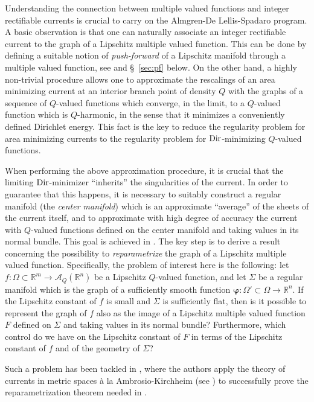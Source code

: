 \documentclass[a4paper,11pt,reqno]{amsart}
\theoremstyle{definition}
\numberwithin{equation}{section}
\numberwithin{subsection}{section}
\newcommand{\R}{\mathbb{R}}
\newcommand{\A}{\mathcal{A}}
\newcommand{\bphi}{\boldsymbol{\varphi}}
\begin{document}
Understanding the connection between multiple valued functions and integer rectifiable currents is crucial to carry on the Almgren-De Lellis-Spadaro program. A basic observation is that one can naturally associate an integer rectifiable current to the graph of a Lipschitz multiple valued function. This can be done by defining a suitable notion of \emph{push-forward} of a Lipschitz manifold through a multiple valued function, see \cite{DLS13a} and \S\, \ref{sec:pf} below. On the other hand, a highly non-trivial procedure allows one to approximate the rescalings of an area minimizing current at an interior branch point of density $Q$ with the graphs of a sequence of $Q$-valued functions which converge, in the limit, to a $Q$-valued function which is $Q$-harmonic, in the sense that it minimizes a conveniently defined Dirichlet energy. This fact is the key to reduce the regularity problem for area minimizing currents to the regularity problem for ${\rm Dir}$-minimizing $Q$-valued functions. 

When performing the above approximation procedure, it is crucial that the limiting ${\rm Dir}$-minimizer ``inherits'' the singularities of the current. In order to guarantee that this happens, it is necessary to suitably construct a regular manifold (the \emph{center manifold}) which is an approximate ``average'' of the sheets of the current itself, and to approximate with high degree of accuracy the current with $Q$-valued functions defined on the center manifold and taking values in its normal bundle. This goal is achieved in \cite{DLS13b}. The key step is to derive a result concerning the possibility to \emph{reparametrize} the graph of a Lipschitz multiple valued function. Specifically, the problem of interest here is the following: let $f \colon \Omega \subset \R^{m} \to \A_{Q}(\R^{n})$ be a Lipschitz $Q$-valued function, and let $\Sigma$ be a regular manifold which is the graph of a sufficiently smooth function $\bphi \colon \Omega' \subset \Omega \to \R^{n}$. If the Lipschitz constant of $f$ is small and $\Sigma$ is sufficiently flat, then is it possible to represent the graph of $f$ also as the image of a Lipschitz multiple valued function $F$ defined on $\Sigma$ and taking values in its normal bundle? Furthermore, which control do we have on the Lipschitz constant of $F$ in terms of the Lipschitz constant of $f$ and of the geometry of $\Sigma$? 

Such a problem has been tackled in \cite{DLS13a}, where the authors apply the theory of currents in metric spaces à la Ambrosio-Kirchheim (see \cite{AK00}) to successfully prove the reparametrization theorem needed in \cite{DLS13b}.
\end{document}
